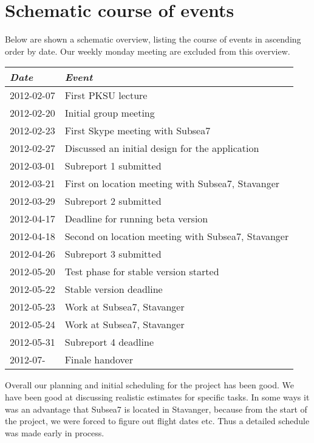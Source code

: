 \section{Schematic course of events }
Below are shown a schematic overview, listing the course of events in ascending order by date. Our weekly monday meeting
are excluded from this overview.
\begin{center}
    \begin{tabular}{ll}
    \emph{Date} & \emph{Event} \\ \hline
    2012-02-07  & First PKSU lecture \\ 
    2012-02-20  & Initial group meeting \\ 
    2012-02-23  & First Skype meeting with Subsea7\\
    2012-02-27  & Discussed an initial design for the application\\
    2012-03-01  & Subreport 1 submitted \\
    2012-03-21  & First on location meeting with Subsea7, Stavanger \\
    2012-03-29  & Subreport 2 submitted \\
    2012-04-17  & Deadline for running beta version \\
    2012-04-18  & Second on location meeting with Subsea7, Stavanger \\
    2012-04-26  & Subreport 3 submitted \\
    2012-05-20  & Test phase for stable version started \\
    2012-05-22  & Stable version deadline \\
    2012-05-23  & Work at Subsea7, Stavanger \\
    2012-05-24  & Work at Subsea7, Stavanger \\
    2012-05-31  & Subreport 4 deadline \\
    2012-07-    & Finale handover \\
    \end{tabular}
\end{center}
Overall our planning and initial scheduling for the project has been good. 
We have been good at discussing realistic estimates for specific tasks. 
In some ways it was an advantage that Subsea7 is located in Stavanger, because from the start of the project, we were forced to figure out flight dates etc. Thus a detailed schedule was made early in process.